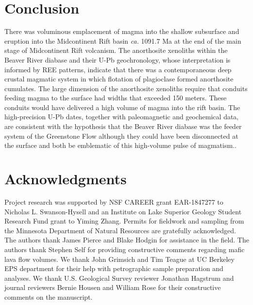 \section{Conclusion}

There was voluminous emplacement of magma into the shallow subsurface and eruption into the Midcontinent Rift basin \textit{ca.} 1091.7 Ma at the end of the main stage of Midcontinent Rift volcanism. The anorthosite xenoliths within the Beaver River diabase and their U-Pb geochronology, whose interpretation is informed by REE patterns, indicate that there was a contemporaneous deep crustal magmatic system in which flotation of plagioclase formed anorthosite cumulates. The large dimension of the anorthosite xenoliths require that conduits feeding magma to the surface had widths that exceeded 150 meters. These conduits would have delivered a high volume of magma into the rift basin. The high-precision U-Pb dates, together with paleomagnetic and geochemical data, are consistent with the hypothesis that the Beaver River diabase was the  feeder system of the Greenstone Flow although they could have been disconnected at the surface and both be emblematic of this high-volume pulse of magmatism..

\section{Acknowledgments}
Project research was supported by NSF CAREER grant EAR-1847277 to Nicholas L. Swanson-Hysell and an Institute on Lake Superior Geology Student Research Fund grant to Yiming Zhang. Permits for fieldwork and sampling from the Minnesota Department of Natural Resources are gratefully acknowledged. The authors thank James Pierce and Blake Hodgin for assistance in the field. The authors thank Stephen Self for providing constructive comments regarding mafic lava flow volumes. We thank John Grimsich and Tim Teague at UC Berkeley EPS department for their help with petrographic sample preparation and analyses. We thank U.S. Geological Survey reviewer Jonathan Hagstrum and journal reviewers Bernie Housen and William Rose for their constructive comments on the manuscript.
